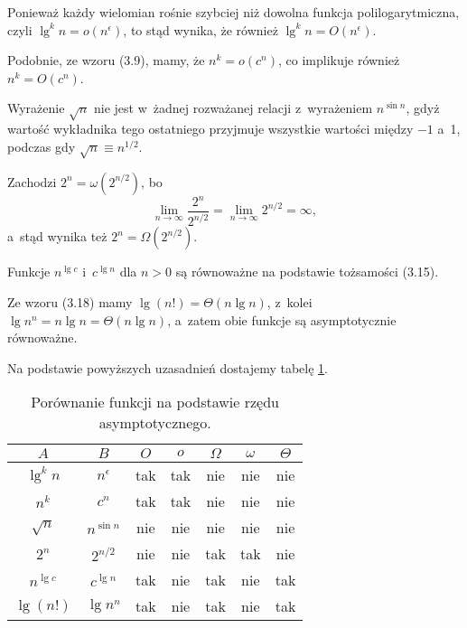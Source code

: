 
\subproblem %
Ponieważ każdy wielomian rośnie szybciej niż dowolna funkcja polilogarytmiczna, czyli $\lg^kn=o(n^\epsilon)$, to stąd wynika, że również $\lg^kn=O(n^\epsilon)$.

\subproblem %
Podobnie, ze wzoru (3.9), mamy, że $n^k=o(c^n)$, co implikuje również $n^k=O(c^n)$.

\subproblem %
Wyrażenie $\sqrt{n}$ nie jest w~żadnej rozważanej relacji z~wyrażeniem $n^{\sin n}$, gdyż wartość wykładnika tego ostatniego przyjmuje wszystkie wartości między $-1$ a~1, podczas gdy $\sqrt{n}\equiv n^{1/2}$.

\subproblem %
Zachodzi $2^n=\omega(2^{n/2})$, bo
\[
	\lim_{n\to\infty}\frac{2^n}{2^{n/2}} = \lim_{n\to\infty}2^{n/2} = \infty,
\]
a~stąd wynika też $2^n=\Omega(2^{n/2})$.

\subproblem %
Funkcje $n^{\lg c}$ i~$c^{\lg n}$ dla $n>0$ są równoważne na podstawie tożsamości (3.15).

\subproblem %
Ze wzoru (3.18) mamy $\lg(n!)=\Theta(n\lg n)$, z~kolei $\lg n^n=n\lg n=\Theta(n\lg n)$, a~zatem obie funkcje są asymptotycznie równoważne.

\bigskip
\noindent Na podstawie powyższych uzasadnień dostajemy tabelę \ref{tab:3-2}.
\begin{table}[!ht]
	\centering
		\begin{tabular}{cc|c|c|c|c|c}
			$A$ & $B$ & $O$ & $o$ & $\Omega$ & $\omega$ & $\Theta$ \\
			\hline
			$\lg^kn$ & $n^\epsilon$ & tak & tak & nie & nie & nie \\
			\hline
			$n^k$ & $c^n$ & tak & tak & nie & nie & nie \\
			\hline
			$\sqrt{n}$ & $n^{\sin n}$ & nie & nie & nie & nie & nie \\
			\hline
			$2^n$ & $2^{n/2}$ & nie & nie & tak & tak & nie \\
			\hline
			$n^{\lg c}$ & $c^{\lg n}$ & tak & nie & tak & nie & tak \\
			\hline
			$\lg(n!)$ & $\lg n^n$ & tak & nie & tak & nie & tak
		\end{tabular}
		\caption{Porównanie funkcji na podstawie rzędu asymptotycznego.} \label{tab:3-2}
\end{table}
